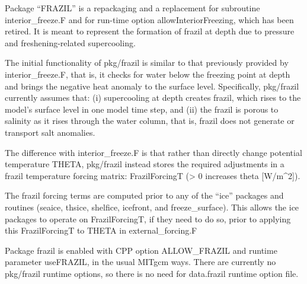 
Package ``FRAZIL'' is a repackaging and a replacement for subroutine
interior_freeze.F and for run-time option allowInteriorFreezing, which has
been retired.  It is meant to represent the formation of frazil at depth due
to pressure and freshening-related supercooling.

The initial functionality of pkg/frazil is similar to that previously provided
by interior_freeze.F, that is, it checks for water below the freezing point at
depth and brings the negative heat anomaly to the surface level.
Specifically, pkg/frazil currently assumes that: (i) supercooling at depth
creates frazil, which rises to the model's surface level in one model time
step, and (ii) the frazil is porous to salinity as it rises through the water
column, that is, frazil does not generate or transport salt anomalies.

The difference with interior_freeze.F is that rather than directly change
potential temperature THETA, pkg/frazil instead stores the required
adjustments in a frazil temperature forcing matrix:
FrazilForcingT (> 0 increases theta [W/m^2]).

The frazil forcing terms are computed prior to any of the ``ice'' packages and
routines (seaice, thsice, shelfice, icefront, and freeze_surface).  This
allows the ice packages to operate on FrazilForcingT, if they need to do so,
prior to applying this FrazilForcingT to THETA in external_forcing.F

Package frazil is enabled with CPP option ALLOW_FRAZIL and runtime parameter
useFRAZIL, in the usual MITgcm ways.  There are currently no pkg/frazil
runtime options, so there is no need for data.frazil runtime option file.
